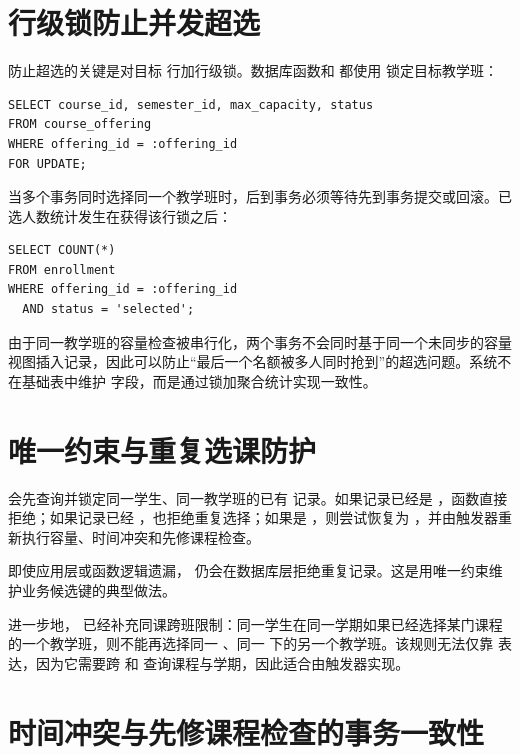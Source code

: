 \section{行级锁防止并发超选}

防止超选的关键是对目标  行加行级锁。数据库函数和  都使用  锁定目标教学班：

\begin{lstlisting}[style=sqlstyle]
SELECT course_id, semester_id, max_capacity, status
FROM course_offering
WHERE offering_id = :offering_id
FOR UPDATE;
\end{lstlisting}

当多个事务同时选择同一个教学班时，后到事务必须等待先到事务提交或回滚。已选人数统计发生在获得该行锁之后：

\begin{lstlisting}[style=sqlstyle]
SELECT COUNT(*)
FROM enrollment
WHERE offering_id = :offering_id
  AND status = 'selected';
\end{lstlisting}

由于同一教学班的容量检查被串行化，两个事务不会同时基于同一个未同步的容量视图插入记录，因此可以防止“最后一个名额被多人同时抢到”的超选问题。系统不在基础表中维护  字段，而是通过锁加聚合统计实现一致性。

\section{唯一约束与重复选课防护}

 会先查询并锁定同一学生、同一教学班的已有  记录。如果记录已经是 ，函数直接拒绝；如果记录已经 ，也拒绝重复选择；如果是 ，则尝试恢复为 ，并由触发器重新执行容量、时间冲突和先修课程检查。

即使应用层或函数逻辑遗漏， 仍会在数据库层拒绝重复记录。这是用唯一约束维护业务候选键的典型做法。

进一步地， 已经补充同课跨班限制：同一学生在同一学期如果已经选择某门课程的一个教学班，则不能再选择同一 、同一  下的另一个教学班。该规则无法仅靠  表达，因为它需要跨  和  查询课程与学期，因此适合由触发器实现。

\section{时间冲突与先修课程检查的事务一致性}

